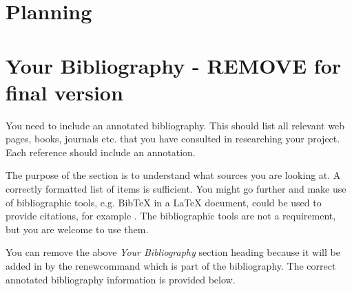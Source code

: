 \documentclass[11pt,fleqn,twoside]{article}
\begin{document}
\section{Planning}

%
%
\section*{Your Bibliography - REMOVE for final version}
%
You need to include an annotated bibliography. This should list all relevant web pages, books, journals etc. that you have consulted in researching your project. Each reference should include an annotation. 

The purpose of the section is to understand what sources you are looking at.  A correctly formatted list of items is sufficient. You might go further and make use of bibliographic tools, e.g. BibTeX in a LaTeX document, could be used to provide citations, for example \cite{NumericalRecipes} \cite{MarksPaper} \cite[99-101]{FailBlog} \cite{kittenpic_ref}.  The bibliographic tools are not a requirement, but you are welcome to use them.   

You can remove the above {\em Your Bibliography} section heading because it will be added in by the renewcommand which is part of the bibliography. The correct annotated bibliography information is provided below. 
%
%


\nocite{*} %

\newpage
{} 

%
%

\renewcommand{\refname}{Annotated Bibliography}  %
\end{document}
